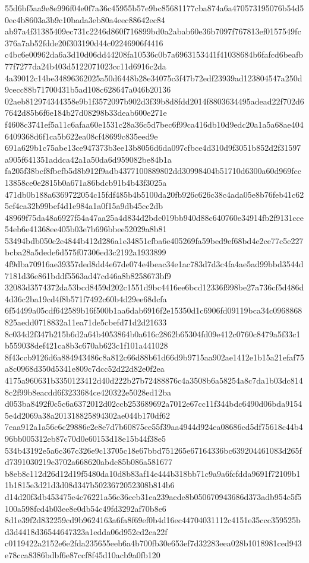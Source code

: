 \documentclass[11pt,a4paper]{article}
\begin{document}
{55d6bf5aa9e8e996f04e0f7a36c45955b57e9bc85681177cba874a6a470573195076b54d50ec4b8603a3b9c10bada3eb80a4eec88642ec84
ab97a4f31385409ec731c2246d860f716899bd0a2abab60e36b7097f767813ef0157549fc376a7ab52fdde20f303190d44c02246906f4416
c4bc6e00962da6a3d10d06dd44208fa10536c0b7a6963153441f41038684b6fafcd6beafb77f7277da24b403d5122071023cc11d6916c2da
4a39012c14be34896362025a50d6448b28e34075c3f47b72edf23939ad123804547a250d9cecc88b71700431b5ad108c628647a046b20136
02aeb812974344358e9b1f3572097b902d3f39b8d8fdd2014f8803634495adead22f702d67642d85b6f6e184b27d08298b33deab600e271e
f4608c3741ef5a11c6afaa60e1531c28a36c5d7bec6f99ca416db10d9edc20a1a5a68ae4046409368d6f1ca5b622ea08cf48699c835eed9e
691a629b1c75abe13ce947373b3ee13b8056d6da097cfbce4d310d9f3051b852d2f31597a905f641351addca42a1a50da6d959082be84b1a
fa205f38bcf8fbefb5d8b912f9adb4377100889802dd30998404b51710d6300a60d969fcc13858ce0e2815b0a671a86bdcb91b4b43f3025a
471db0b188a6369722054c15fdf485b4b5100da20fb926c626c38c4ada05e8b76feb41c625ef4ca32b99bef4d1e984a1a0f15a9db45cc2db
48969f75da48a6927f54a47aa25a4d834d2bdc019bb940d88c640760e34914fb2f9131cce54eb6e41368ee405b03e7b696bbee52029a8b81
53494bdb050c2e4844b412d286a1e34851cfba6e405269fa59bed9ef68bd4e2ce77c5e227bcba28a5dede6d575f07306ed3c2192a1933899
4f9dba70916ae39357ded8dd4e67de074e4beac34e1ac783d7d3c4fa4ae5ad99bbd3544d7181d36e861bddf5563ad47cd46a8b8258673bf9
32083d3574372da53bcd8459d202c1551d9bc4416ee6bcd12336f998be27a736cf5d486d4d36c2ba19cd4f8b571f7492c60b4d29ee68dcfa
6f54499a05cdf642589b16f500b1aa6dab6916f2e15350d1c6906fd09119bca34c0968868825aedd0718832a11ea71de5cbefd71d2d21633
8c034d2f347b215b6d2a64b4053864b0a616c2862b65304fd09e412c0760c8479a5f33c1b559038def421ca8b3c670ab623c1f101a441028
8f43ccb9126d6a884943486c8a812c66d88b61d66d9b9715aa902ae1412e1b15a21efaf75a8c0968d350d5341e809c7dcc52d22d82e0f2ea
4175a960631b3350123412d40d222b27b72488876c4a3508b6a58254a8c7da1b03dc8148c2f99b8eacdd6f3233684ce420322e5028ed12ba
d053ba8492f0c5c6a6372012d02ccb253689692a7012e67cc11f344bdc6490d06bda91545e4d2069a38a201318825894302ae044b170df62
7eaa912a1a56c6c29886e2e8e7d7b60875ce55f39aa4944d924ea08686cd5df75618c44b496bb005312eb87c70d0e60153d18e15b44f38e5
534b43192e5a6c367c326e9c13705c18e67bbd751265e67164336bc639204461083d265fd7391030219e3702a668620abdc85b086a581677
b8eb8c112d26d12d19f5480da10d8b83af14e444b318bb71c9a9a6fcfdda9691f72109b11b1815e3d21d3d08d347b5023672052308b814b6
d14d20f3db453475e4c76221a56c36ceb31ea239aede8b050670943686d373adb954c5f5100a598fcd4b03ee8e0db54c49fd3292af70b8e6
8d1e39f2d832259cd9b9624163a6fa8f69ef0b4d16ec44704031112c4151e35ccc359525bd3d4418d36544647323a1edda06d952cd2ea22f
c0119422a2152e6e2fda235655eeb6a4b700fb30e653ef7d32283eea028b1018981ced943e78cca8386bdbf6e87ccf8f45d10acb9a0fb120
}
\end{document}
